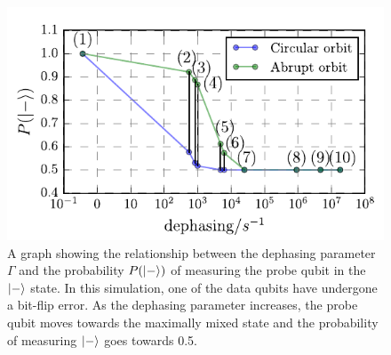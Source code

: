 \begin{figure}[h]
	\centering
	\includegraphics[width=\linewidth]{../Figures/dephasing.pdf}
		\caption{A graph showing the relationship between the dephasing parameter $\Gamma$ and the probability $P(\ket{-})$ of measuring the probe qubit in the $\ket{-}$ state. In this simulation, one of the data qubits have undergone a bit-flip error. As the dephasing parameter increases, the probe qubit moves towards the maximally mixed state and the probability of measuring $\ket{-}$ goes towards 0.5.}
		\label{fig:phaseplot}
\end{figure}





